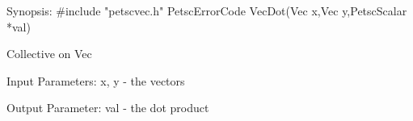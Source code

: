 Synopsis:
#include "petscvec.h"
PetscErrorCode VecDot(Vec x,Vec y,PetscScalar *val)

Collective on Vec

Input Parameters:
x, y - the vectors

Output Parameter:
val - the dot product
